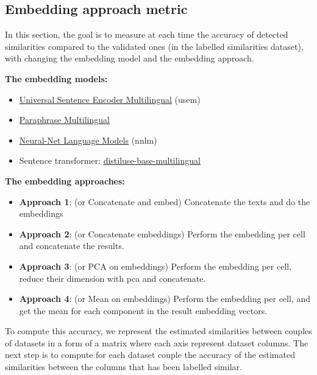 
\subsection{Embedding approach metric}
In this section, the goal is to measure at each time the accuracy of detected
similarities compared to the validated ones (in the labelled similarities
dataset), with changing the embedding model and the embedding approach.

\begin{multicols}{2}
    \textbf{The embedding models:}
    \begin{itemize}
        \item \href{https://tfhub.dev/google/universal-sentence-encoder/4}
              {Universal Sentence Encoder Multilingual} (\acrshort{usem})
        \item
              \href{https://huggingface.co/sentence-transformers/paraphrase-multilingual-MiniLM-L12-v2}
              {Paraphrase Multilingual}
        \item
              \href{https://tfhub.dev/google/nnlm-en-dim50-with-normalization/2}
              {Neural-Net Language Models} (\acrshort{nnlm})
        \item Sentence transformer:
              \href{https://huggingface.co/sentence-transformers/distiluse-base-multilingual-cased-v2}
              {distiluse-base-multilingual}
    \end{itemize}
    \columnbreak
    \textbf{The embedding approaches:}
    \begin{itemize}
        \item \textbf{Approach 1}: (or Concatenate and embed) Concatenate the texts and do the embeddings
        \item \textbf{Approach 2}: (or Concatenate embeddings) Perform the embedding per cell and concatenate the results.
        \item \textbf{Approach 3}: (or PCA on embeddings) Perform the embedding per cell, reduce their dimension with
              \acrshort{pca} and concatenate.
        \item \textbf{Approach 4}: (or Mean on embeddings) Perform the embedding per cell, and get the mean for each
              component in the result embedding vectors.
    \end{itemize}
\end{multicols}

To compute this accuracy, we represent the estimated similarities between couples
of datasets in a form of a matrix where each axis represent dataset columns. The
next step is to compute for each dataset couple the accuracy of the estimated
similarities between the columns that has been labelled similar.

